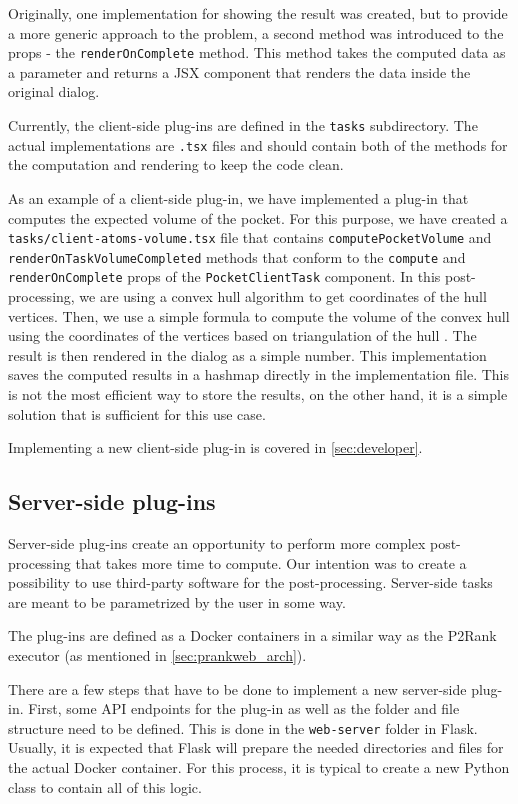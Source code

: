Originally, one implementation for showing the result was created, but to provide a more generic approach to the problem, a second method was introduced to the props - the \texttt{renderOnComplete} method. This method takes the computed data as a parameter and returns a JSX component that renders the data inside the original dialog.

Currently, the client-side plug-ins are defined in the \texttt{tasks} subdirectory. The actual implementations are \texttt{.tsx} files and should contain both of the methods for the computation and rendering to keep the code clean.

As an example of a client-side plug-in, we have implemented a plug-in that computes the expected volume of the pocket. For this purpose, we have created a \texttt{tasks/client-atoms-volume.tsx} file that contains \texttt{computePocketVolume} and \texttt{renderOnTaskVolumeCompleted} methods that conform to the \texttt{compute} and \texttt{renderOnComplete} props of the \texttt{PocketClientTask} component. In this post-processing, we are using a convex hull algorithm to get coordinates of the hull vertices. Then, we use a simple formula to compute the volume of the convex hull using the coordinates of the vertices based on triangulation of the hull \cite{zhang2001efficient}. The result is then rendered in the dialog as a simple number. This implementation saves the computed results in a hashmap directly in the implementation file. This is not the most efficient way to store the results, on the other hand, it is a simple solution that is sufficient for this use case.

Implementing a new client-side plug-in is covered in \cref{sec:developer}.

\subsection{Server-side plug-ins}
\label{subsec:server-side-plugins}

Server-side plug-ins create an opportunity to perform more complex post-processing that takes more time to compute. Our intention was to create a possibility to use third-party software for the post-processing. Server-side tasks are meant to be parametrized by the user in some way.

The plug-ins are defined as a Docker containers in a similar way as the P2Rank executor (as mentioned in \cref{sec:prankweb_arch}).

There are a few steps that have to be done to implement a new server-side plug-in. First, some API endpoints for the plug-in as well as the folder and file structure need to be defined. This is done in the \texttt{web-server} folder in Flask. Usually, it is expected that Flask will prepare the needed directories and files for the actual Docker container. For this process, it is typical to create a new Python class to contain all of this logic.

